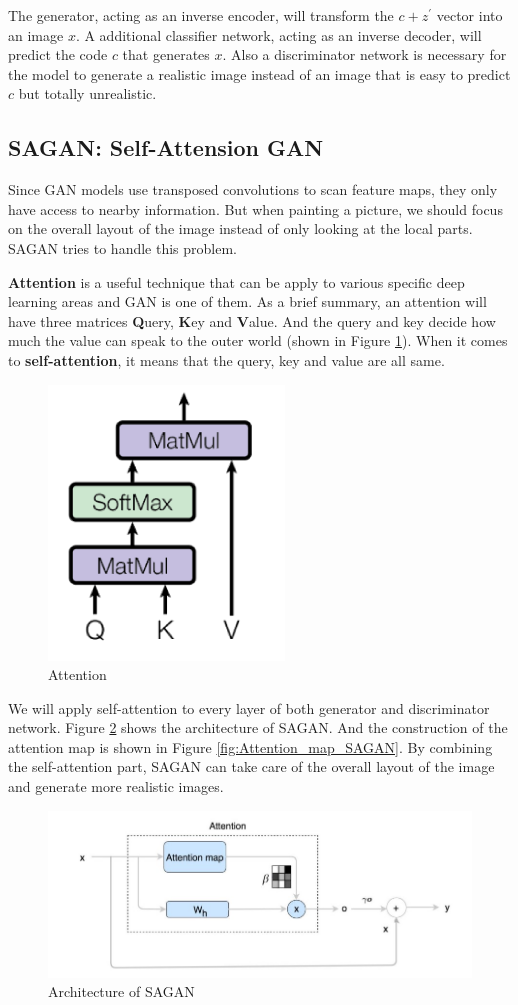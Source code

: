 \documentclass{article} %
\begin{document}
The generator, acting as an inverse encoder, will transform the $c+z^{'}$ vector into an image $x$. A additional classifier network, acting as an inverse decoder, will predict the code $c$ that generates $x$. Also a discriminator network is necessary for the model to generate a realistic image instead of an image that is easy to predict $c$ but totally unrealistic.

\subsection{SAGAN: Self-Attension GAN}

Since GAN models use transposed convolutions to scan feature maps, they only have access to nearby information. But when painting a picture, we should focus on the overall layout of the image instead of only looking at the local parts. SAGAN tries to handle this problem.

\textbf{Attention} is a useful technique that can be apply to various specific deep learning areas and GAN is one of them. As a brief summary, an attention will have three matrices \textbf{Q}uery, \textbf{K}ey and \textbf{V}alue. And the query and key decide how much the value can speak to the outer world (shown in Figure \ref{fig:Attention}). When it comes to \textbf{self-attention}, it means that the query, key and value are all same.

\begin{figure}[h]
	\centering
	\includegraphics[width=0.2\linewidth]{figures/Attention.png}
	\caption{Attention}
	\label{fig:Attention}
\end{figure}

We will apply self-attention to every layer of both generator and discriminator network. Figure \ref{fig:Architecture_SAGAN} shows the architecture of SAGAN. And the construction of the attention map is shown in Figure \ref{fig:Attention_map_SAGAN}. By combining the self-attention part, SAGAN can take care of the overall layout of the image and generate more realistic images.

\begin{figure}[h]
	\centering
	\includegraphics[width=0.7\linewidth]{figures/SAGAN_layer.jpeg}
	\caption{Architecture of SAGAN}
	\label{fig:Architecture_SAGAN}
\end{figure} 
\end{document}
